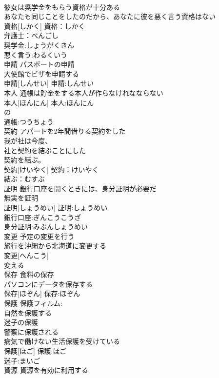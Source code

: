 \documentclass[8pt]{extreport}
\begin{document}
\begin{CJK}{UTF8}{min}
\\	彼女は奨学金をもらう資格が十分ある 
\\	あなたも同じことをしたのだから、あなたに彼を悪く言う資格はない 
\\	資格[しかく]			資格：しかく
\\	弁護士：べんごし
\\	奨学金:しょうがくきん
\\	悪く言う:わるくいう
\\	申請	パスポートの申請 
\\	大使館でビザを申請する 
\\	申請[しんせい]			申請:しんせい
\\	本人	通帳は貯金をする本人が作らなけれなならない 
\\	本人[ほんにん]			本人:ほんにん
\\	の 
\\	通帳:つうちょう
\\	契約	アパートを2年間借りる契約をした 
\\	我が社は今度、
\\	社と契約を結ぶことにした 
\\	契約を結ぶ。
\\	契約[けいやく]			契約：けいやく
\\	結ぶ：むすぶ
\\	証明	銀行口座を開くときには、身分証明が必要だ 
\\	無実を証明 
\\	証明[しょうめい]			証明:しょうめい
\\	銀行口座:ぎんこうこうざ
\\	身分証明:みぶんしょうめい 
\\	変更	予定の変更を行う 
\\	旅行を沖縄から北海道に変更する 
\\	変更[へんこう]			
\\	変える 
\\	保存	食料の保存 
\\	パソコンにデータを保存する 
\\	保存[ほぞん]			保存:ほぞん
\\	保護	保護フィルム: 
\\	自然を保護する 
\\	迷子の保護 
\\	警察に保護される 
\\	病気で働けない生活保護を受けている 
\\	保護[ほご]			保護:ほご
\\	迷子:まいご
\\	資源	資源を有効に利用する 

\end{CJK}
\end{document}
